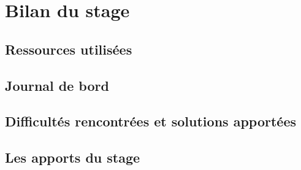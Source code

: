 
\chapter{Bilan du stage} %

\label{Chapter6} %


\section{Ressources utilisées}


\section{Journal de bord}


\section{Difficultés rencontrées et solutions apportées}


\section{Les apports du stage}

